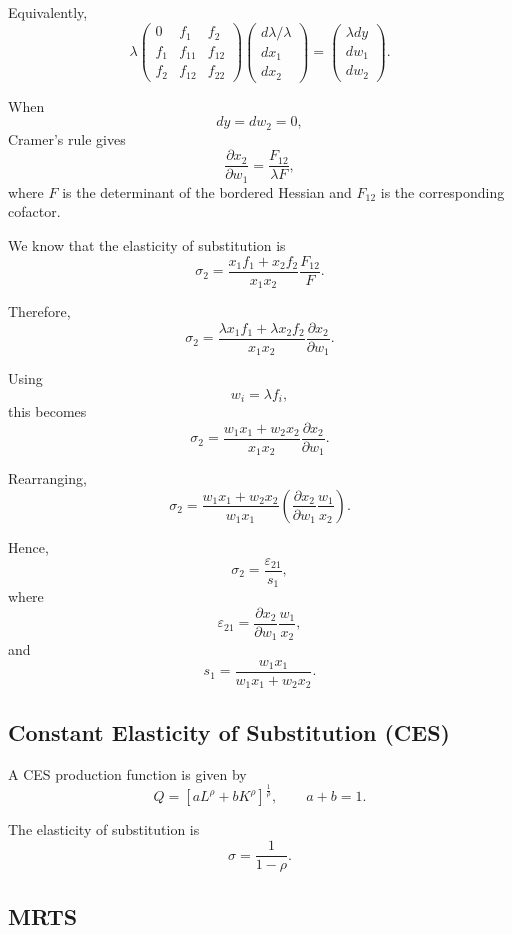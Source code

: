 Equivalently,
\[
\lambda
\begin{pmatrix}
0 & f_1 & f_2 \\
f_1 & f_{11} & f_{12} \\
f_2 & f_{12} & f_{22}
\end{pmatrix}
\begin{pmatrix}
d\lambda/\lambda \\
dx_1 \\
dx_2
\end{pmatrix}
=
\begin{pmatrix}
\lambda dy \\
dw_1 \\
dw_2
\end{pmatrix}.
\]

When
\[
dy=dw_2=0,
\]
Cramer's rule gives
\[
\frac{\partial x_2}{\partial w_1}
=
\frac{F_{12}}{\lambda F},
\]
where \(F\) is the determinant of the bordered Hessian and \(F_{12}\) is the corresponding cofactor.

We know that the elasticity of substitution is
\[
\sigma_2=
\frac{x_1f_1+x_2f_2}{x_1x_2}\frac{F_{12}}{F}.
\]

Therefore,
\[
\sigma_2
=
\frac{\lambda x_1f_1+\lambda x_2f_2}{x_1x_2}
\frac{\partial x_2}{\partial w_1}.
\]

Using
\[
w_i=\lambda f_i,
\]
this becomes
\[
\sigma_2
=
\frac{w_1x_1+w_2x_2}{x_1x_2}
\frac{\partial x_2}{\partial w_1}.
\]

Rearranging,
\[
\sigma_2
=
\frac{w_1x_1+w_2x_2}{w_1x_1}
\left(\frac{\partial x_2}{\partial w_1}\frac{w_1}{x_2}\right).
\]

Hence,
\[
\sigma_2=\frac{\varepsilon_{21}}{s_1},
\]
where
\[
\varepsilon_{21}
=
\frac{\partial x_2}{\partial w_1}\frac{w_1}{x_2},
\]
and
\[
s_1=
\frac{w_1x_1}{w_1x_1+w_2x_2}.
\]

\subsection{Constant Elasticity of Substitution (CES)}

A CES production function is given by
\[
Q =
\left[
aL^{\rho} + bK^{\rho}
\right]^{\frac{1}{\rho}},
\qquad a + b = 1.
\]

The elasticity of substitution is
\[
\sigma = \frac{1}{1-\rho}.
\]

\subsection*{MRTS}

